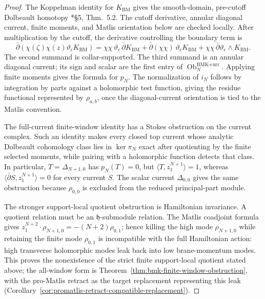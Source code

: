 \documentclass[11pt]{memoir}
\begin{document}
\begin{proof}
  The Koppelman identity for \(K_{\mathrm{BM}}\) gives the
  smooth-domain, pre-cutoff Dolbeault homotopy
  \cite{ruppenthal-bmk}*{\S5, Thm.~5.2}.  The cutoff derivative,
  annular diagonal current, finite moments, and Matlis orientation below
  are checked locally.  After multiplication by the cutoff, the
  derivative controlling the boundary term is
  \[
    \bar\partial(\chi(\zeta)\chi(z)
      \vartheta_\epsilon K_{\mathrm{BM}})
    =
    \chi\chi\,\vartheta_\epsilon\,\bar\partial K_{\mathrm{BM}}
    +\bar\partial(\chi\chi)\,\vartheta_\epsilon K_{\mathrm{BM}}
    +\chi\chi\,\bar\partial\vartheta_\epsilon\wedge K_{\mathrm{BM}} .
  \]
  The second summand is collar-supported.  The third summand is an
  annular diagonal current; its sign and scalar are the first entry of
  \(\operatorname{Ob}^{\mathrm{BMK\mbox{-}curr}}_N\).  Applying finite
  moments gives the formula for \(p_N\).  The normalization of \(i_N\)
  follows by integration by parts against a holomorphic test function,
  giving the residue functional represented by \(\rho_{a,b}\), once the
  diagonal-current orientation is tied to the Matlis convention.

  The full-current finite-window identity has a Stokes obstruction on the
  current complex.  Such an identity makes every closed top current whose analytic
  Dolbeault cohomology class lies in \(\ker\pi_N\) exact after quotienting
  by the finite selected moments, while pairing with a holomorphic
  function detects that class.  In particular,
  \(T=\Delta_{N+1,0}\) has \(p_N(T)=0\), but
  \(\langle T,z_1^{N+1}\rangle=1\), whereas
  \(\langle\bar\partial S,z_1^{N+1}\rangle=0\) for every current \(S\).
  The scalar current \(\Delta_{0,0}\) gives the same obstruction because
  \(\rho_{0,0}\) is excluded from the reduced principal-part module.

  The stronger support-local quotient obstruction is Hamiltonian
  invariance.  A quotient relation must be an
  \(\mathfrak h\)-submodule relation.  The Matlis coadjoint formula gives
  \(z_1^{N+2}\cdot\rho_{N+1,0}=-(N+2)\rho_{0,1}\); hence killing the high
  mode \(\rho_{N+1,0}\) while retaining the finite mode \(\rho_{0,1}\)
  is incompatible with the full Hamiltonian action: high transverse
  holomorphic modes leak back into low brane-momentum modes.  This
  proves the nonexistence of the strict finite support-local quotient
  stated above; the all-window form is
  Theorem~\ref{thm:bmk-finite-window-obstruction}, with the pro-Matlis
  retract as the target replacement representing this leak
  (Corollary~\ref{cor:promatlis-retract-compatible-replacement}).


\end{proof}
\end{document}
